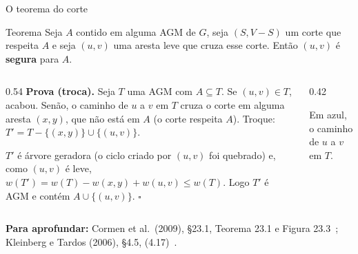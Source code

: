 \documentclass[aspectratio=169,xcolor=table]{beamer}
\newcommand{\fonte}[1]{%
  \vfill
  {\tiny\color{gray!55!black}\textbf{Para aprofundar:} #1\par}%
}
\begin{document}
\begin{frame}{O teorema do corte}
  \begin{block}{Teorema}
    \small Seja $A$ contido em alguma AGM de $G$, seja $(S, V - S)$ um corte que respeita $A$ e
    seja $(u,v)$ uma aresta leve que cruza esse corte. Então $(u,v)$ é \textbf{segura} para $A$.
  \end{block}
  \begin{columns}[c]
    \begin{column}{0.54\textwidth}
      \scriptsize
      \textbf{Prova (troca).} Seja $T$ uma AGM com $A \subseteq T$. Se $(u,v) \in T$, acabou.
      Senão, o caminho de $u$ a $v$ em $T$ cruza o corte em alguma aresta $(x,y)$, que não
      está em $A$ (o corte respeita $A$). Troque: $T' = T - \{(x,y)\} \cup \{(u,v)\}$.
      \smallskip

      $T'$ é árvore geradora (o ciclo criado por $(u,v)$ foi quebrado) e, como $(u,v)$ é leve,
      $w(T') = w(T) - w(x,y) + w(u,v) \le w(T)$. Logo $T'$ é AGM e contém
      $A \cup \{(u,v)\}$. \hfill$\square$
    \end{column}
    \begin{column}{0.42\textwidth}
      \smallskip

      \tiny Em azul, o caminho de $u$ a $v$ em $T$.
    \end{column}
  \end{columns}
  \fonte{Cormen et al.\ (2009), \S 23.1, Teorema 23.1 e Figura 23.3~\cite{cormen2009introduction};
    Kleinberg e Tardos (2006), \S 4.5, (4.17)~\cite{kleinberg2006algorithm}.}
\end{frame}
\end{document}
